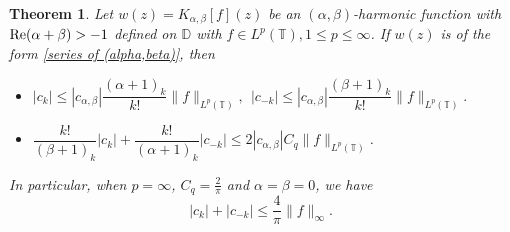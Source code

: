 \documentclass[10pt,a4paper]{amsart}
\newtheorem{theorem}{Theorem}
\begin{document}
\begin{theorem}\label{t4}
	Let $w(z)=K_{\alpha,\beta}[f](z)$ be an $(\alpha,\beta)$-harmonic function with $\mbox{\rm Re}(\alpha+\beta)>-1$ defined on  $\mathbb{D}$  with $f\in L^p(\mathbb{T}),1\leq p\leq \infty$. If $w(z)$ is of the form \eqref{series of (alpha,beta)}, then 
	\begin{itemize}
		\item [(i)] $|c_k|\leq |c_{\alpha,\beta}|\dfrac{(\alpha+1)_{k}}{k!}\|f\|_{L^p(\mathbb{T})},\ \ |c_{-k}|\leq|c_{\alpha,\beta}|\dfrac{(\beta+1)_{k}}{k!}\|f\|_{L^p(\mathbb{T})}.$
		\item [(ii)]$\dfrac{k!}{(\beta+1)_{k}}|c_k|+\dfrac{k!}{(\alpha+1)_{k}}|c_{-k}|\leq 2|c_{\alpha,\beta}|C_q\|f\|_{L^p(\mathbb{T})}$.
	\end{itemize}
In particular, when $p=\infty$, $C_q=\frac{2}{\pi}$ and $\alpha=\beta=0$, we have $$|c_k|+|c_{-k}|\leq\frac{4}{\pi}\|f\|_{\infty}.$$
\end{theorem}
\end{document}
